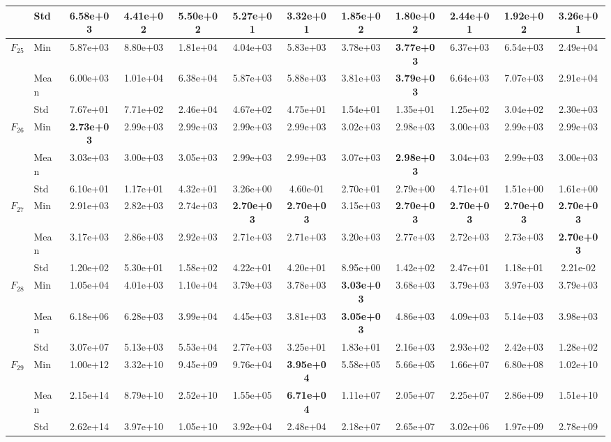 \begin{center}
\begin{longtable}{clcccccccccc}
 & Std & 6.58e+03 & 4.41e+02 & 5.50e+02 & 5.27e+01 & 3.32e+01 & 1.85e+02 & 1.80e+02 & 2.44e+01 & 1.92e+02 & 3.26e+01 \\
\midrule
\multirow{3}{*}{$F_{25}$} & Min & 5.87e+03 & 8.80e+03 & 1.81e+04 & 4.04e+03 & 5.83e+03 & 3.78e+03 & \textbf{3.77e+03} & 6.37e+03 & 6.54e+03 & 2.49e+04 \\
 & Mean & 6.00e+03 & 1.01e+04 & 6.38e+04 & 5.87e+03 & 5.88e+03 & 3.81e+03 & \textbf{3.79e+03} & 6.64e+03 & 7.07e+03 & 2.91e+04 \\
 & Std & 7.67e+01 & 7.71e+02 & 2.46e+04 & 4.67e+02 & 4.75e+01 & 1.54e+01 & 1.35e+01 & 1.25e+02 & 3.04e+02 & 2.30e+03 \\
\midrule
\multirow{3}{*}{$F_{26}$} & Min & \textbf{2.73e+03} & 2.99e+03 & 2.99e+03 & 2.99e+03 & 2.99e+03 & 3.02e+03 & 2.98e+03 & 3.00e+03 & 2.99e+03 & 2.99e+03 \\
 & Mean & 3.03e+03 & 3.00e+03 & 3.05e+03 & 2.99e+03 & 2.99e+03 & 3.07e+03 & \textbf{2.98e+03} & 3.04e+03 & 2.99e+03 & 3.00e+03 \\
 & Std & 6.10e+01 & 1.17e+01 & 4.32e+01 & 3.26e+00 & 4.60e-01 & 2.70e+01 & 2.79e+00 & 4.71e+01 & 1.51e+00 & 1.61e+00 \\
\midrule
\multirow{3}{*}{$F_{27}$} & Min & 2.91e+03 & 2.82e+03 & 2.74e+03 & \textbf{2.70e+03} & \textbf{2.70e+03} & 3.15e+03 & \textbf{2.70e+03} & \textbf{2.70e+03} & \textbf{2.70e+03} & \textbf{2.70e+03} \\
 & Mean & 3.17e+03 & 2.86e+03 & 2.92e+03 & 2.71e+03 & 2.71e+03 & 3.20e+03 & 2.77e+03 & 2.72e+03 & 2.73e+03 & \textbf{2.70e+03} \\
 & Std & 1.20e+02 & 5.30e+01 & 1.58e+02 & 4.22e+01 & 4.20e+01 & 8.95e+00 & 1.42e+02 & 2.47e+01 & 1.18e+01 & 2.21e-02 \\
\midrule
\multirow{3}{*}{$F_{28}$} & Min & 1.05e+04 & 4.01e+03 & 1.10e+04 & 3.79e+03 & 3.78e+03 & \textbf{3.03e+03} & 3.68e+03 & 3.79e+03 & 3.97e+03 & 3.79e+03 \\
 & Mean & 6.18e+06 & 6.28e+03 & 3.99e+04 & 4.45e+03 & 3.81e+03 & \textbf{3.05e+03} & 4.86e+03 & 4.09e+03 & 5.14e+03 & 3.98e+03 \\
 & Std & 3.07e+07 & 5.13e+03 & 5.53e+04 & 2.77e+03 & 3.25e+01 & 1.83e+01 & 2.16e+03 & 2.93e+02 & 2.42e+03 & 1.28e+02 \\
\midrule
\multirow{3}{*}{$F_{29}$} & Min & 1.00e+12 & 3.32e+10 & 9.45e+09 & 9.76e+04 & \textbf{3.95e+04} & 5.58e+05 & 5.66e+05 & 1.66e+07 & 6.80e+08 & 1.02e+10 \\
 & Mean & 2.15e+14 & 8.79e+10 & 2.52e+10 & 1.55e+05 & \textbf{6.71e+04} & 1.11e+07 & 2.05e+07 & 2.25e+07 & 2.86e+09 & 1.51e+10 \\
 & Std & 2.62e+14 & 3.97e+10 & 1.05e+10 & 3.92e+04 & 2.48e+04 & 2.18e+07 & 2.65e+07 & 3.02e+06 & 1.97e+09 & 2.78e+09 \\
\bottomrule
\end{longtable}
\end{center}